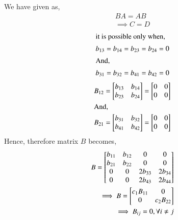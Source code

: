 \documentclass[journal,12pt,twocolumn]{IEEEtran}
\begin{document}
We have given as,
\begin{align}
BA = AB\\
\implies C = D
\end{align}
\begin{align}
\intertext{it is possible only when,}
b_{13}= b_{14} = b_{23}= b_{24} = 0 \\
\intertext{And,}
 b_{31} = b_{32} = b_{41} = b_{42} = 0
 \end{align}
 \begin{align}
B_{12} =  \begin{bmatrix}
b_{13} & b_{14}\\ 
b_{23}  & b_{24}  
\end{bmatrix} =  \begin{bmatrix}
0 & 0\\ 
0  & 0  
\end{bmatrix}\\ 
\intertext{And,}
B_{21} =  \begin{bmatrix}
b_{31} & b_{32}\\
b_{41}  & b_{42}  
\end{bmatrix}  =  \begin{bmatrix}
0 & 0\\ 
0  & 0  
\end{bmatrix} 
\end{align}
Hence, therefore matrix $B$ becomes,
\begin{align}
B =  \begin{bmatrix}
b_{11} & b_{12}  & 0       & 0 \\ 
b_{21} & b_{22}  & 0       & 0  \\
0      & 0       & 2b_{33} & 2b_{34}  \\
0      & 0       & 2b_{43} & 2b_{44}    
\end{bmatrix}\\
\implies B =  \begin{bmatrix}
c_1B_{11} & \huge{0} \\ 
\huge{0}  & c_2B_{22}  
\end{bmatrix}\\
\implies B_{ij} = 0, \forall i \neq j
\end{align}
\end{document}

